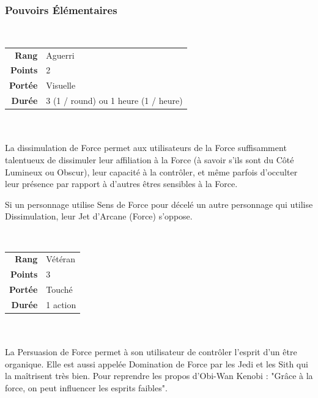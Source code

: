 \subsubsection{Pouvoirs \'Elémentaires}
\begin{description}[align=left] 

    \item [Dissimulation de Force] ~ \\

        \begin{tabular}{ r l }
            \textbf{Rang}    & Aguerri \\
            \textbf{Points}  & 2 \\
            \textbf{Portée}  & Visuelle \\
            \textbf{Durée}   & 3 (1 / round) ou 1 heure (1 / heure) \\
        \end{tabular}
        \\ \\
		La dissimulation de Force permet aux utilisateurs de la Force suffisamment talentueux de dissimuler leur affiliation à la Force (à savoir s'ils sont du Côté Lumineux ou Obscur), leur capacité à la contrôler, et même parfois d'occulter leur présence par rapport à d'autres êtres sensibles à la Force. 

		Si un personnage utilise Sens de Force pour décelé un autre personnage qui utilise Dissimulation, leur Jet d'Arcane (Force) s'oppose.
        \\

	\item [Persuasion de Force] ~ \\

        \begin{tabular}{ r l }
            \textbf{Rang}    & Vétéran \\
            \textbf{Points}  & 3 \\
            \textbf{Portée}  & Touché \\
            \textbf{Durée}   & 1 action \\
        \end{tabular}
        \\ \\
		La Persuasion de Force permet à son utilisateur de contrôler l'esprit d'un être organique. Elle est aussi appelée Domination de Force par les Jedi et les Sith qui la maîtrisent très bien. Pour reprendre les propos d'Obi-Wan Kenobi : "Grâce à la force, on peut influencer les esprits faibles". 


\end{description}
